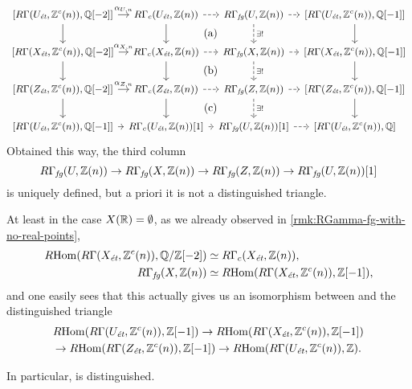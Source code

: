 \begin{equation}
  \label{eqn:naive-diagram-giving-RGammafg-triangle}
  \begin{tikzcd}[column sep=0.5em, font=\small]
    {[R\Gamma (U_\text{\it ét}, \ZZ^c (n)), \QQ [-2]]} \ar{d}\ar{r}{\alpha_{U,n}} & R\Gamma_c (U_\text{\it ét}, \ZZ (n)) \ar{d}\ar[dashed]{r}\ar[phantom]{dr}{\text{(a)}} & R\Gamma_\text{\it fg} (U, \ZZ(n))\ar[dashed]{r}\ar[dashed]{d}{\exists !} & {[R\Gamma (U_\text{\it ét}, \ZZ^c (n)), \QQ [-1]]} \ar{d} \\
    {[R\Gamma (X_\text{\it ét}, \ZZ^c (n)), \QQ [-2]]} \ar{d}\ar{r}{\alpha_{X,n}} & R\Gamma_c (X_\text{\it ét}, \ZZ (n)) \ar{d}\ar[dashed]{r}\ar[phantom]{dr}{\text{(b)}} & R\Gamma_\text{\it fg} (X, \ZZ(n))\ar[dashed]{r} \ar[dashed]{d}{\exists !} & {[R\Gamma (X_\text{\it ét}, \ZZ^c (n)), \QQ [-1]]} \ar{d} \\
    {[R\Gamma (Z_\text{\it ét}, \ZZ^c (n)), \QQ [-2]]} \ar{d}\ar{r}{\alpha_{Z,n}} & R\Gamma_c (Z_\text{\it ét}, \ZZ (n)) \ar{d}\ar[dashed]{r}\ar[phantom]{dr}{\text{(c)}} & R\Gamma_\text{\it fg} (Z, \ZZ(n))\ar[dashed]{r} \ar[dashed]{d}{\exists !} & {[R\Gamma (Z_\text{\it ét}, \ZZ^c (n)), \QQ [-1]]} \ar{d} \\
    {[R\Gamma (U_\text{\it ét}, \ZZ^c (n)), \QQ [-1]]}\ar{r} & R\Gamma_c (U_\text{\it ét}, \ZZ (n)) [1]\ar[dashed]{r} & R\Gamma_\text{\it fg} (U, \ZZ(n)) [1]\ar[dashed]{r} & {[R\Gamma (U_\text{\it ét}, \ZZ^c (n)), \QQ]}
  \end{tikzcd}
\end{equation}
Obtained this way, the third column
\begin{equation}
  \label{eqn:RGammafg-triangle-constructed-naively}
  R\Gamma_\text{\it fg} (U, \mathbb{Z}(n)) \to
  R\Gamma_\text{\it fg} (X, \mathbb{Z}(n)) \to
  R\Gamma_\text{\it fg} (Z, \mathbb{Z}(n)) \to
  R\Gamma_\text{\it fg} (U, \mathbb{Z}(n)) [1]
\end{equation}
is uniquely defined, but a priori it is not a distinguished triangle.

\begin{nameless}
  At least in the case $X (\mathbb{R}) = \emptyset$, as we already observed in
  \ref{rmk:RGamma-fg-with-no-real-points},
  \begin{align*}
    R\!\operatorname{Hom} (R\Gamma (X_\text{\it ét}, \mathbb{Z}^c (n)), \mathbb{Q}/\mathbb{Z} [-2]) & \simeq R\Gamma_c (X_\text{\it ét}, \mathbb{Z} (n)),\\
    R\Gamma_\text{\it fg} (X, \mathbb{Z} (n)) & \simeq R\!\operatorname{Hom} (R\Gamma (X_\text{\it ét}, \mathbb{Z}^c (n)), \mathbb{Z} [-1]),
  \end{align*}
  and one easily sees that this actually gives us an isomorphism between
   and the distinguished
  triangle
  \begin{multline*}
    R\!\operatorname{Hom} (R\Gamma (U_\text{\it ét}, \mathbb{Z}^c (n)), \mathbb{Z} [-1]) \to
    R\!\operatorname{Hom} (R\Gamma (X_\text{\it ét}, \mathbb{Z}^c (n)), \mathbb{Z} [-1]) \\
    \to R\!\operatorname{Hom} (R\Gamma (Z_\text{\it ét}, \mathbb{Z}^c (n)), \mathbb{Z} [-1]) \to
    R\!\operatorname{Hom} (R\Gamma (U_\text{\it ét}, \mathbb{Z}^c (n)), \mathbb{Z}).
  \end{multline*}

  \noindent In particular,  is
  distinguished.
\end{nameless}

